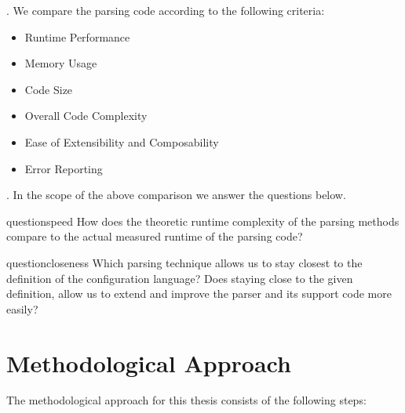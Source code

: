 . We compare the parsing code according to the following criteria:

\begin{itemize}
  \item Runtime Performance
  \item Memory Usage
  \item Code Size
  \item Overall Code Complexity
  \item Ease of Extensibility and Composability
  \item Error Reporting
\end{itemize}

. In the scope of the above comparison we answer the questions below.

\begin{restatable}{question}{speed}
  \label{que:speed}
  How does the theoretic runtime complexity of the parsing methods compare to the actual measured runtime of the parsing code?
\end{restatable}

\begin{restatable}{question}{closeness}
  \label{que:closeness}
  Which parsing technique allows us to stay closest to the definition of the configuration language? Does staying close to the given definition,
  allow us to extend and improve the parser and its support code more easily?
\end{restatable}

\section{Methodological Approach}

The methodological approach for this thesis consists of the following steps:

